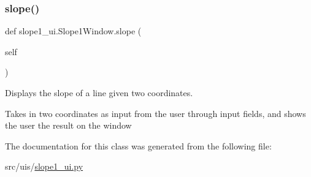 \subsubsection{\texorpdfstring{slope()}{slope()}}
{\footnotesize\ttfamily def slope1\+\_\+ui.\+Slope1\+Window.\+slope (\begin{DoxyParamCaption}\item[{}]{self }\end{DoxyParamCaption})}



Displays the slope of a line given two coordinates. 

Takes in two coordinates as input from the user through input fields, and shows the user the result on the window 

The documentation for this class was generated from the following file\+:\begin{DoxyCompactItemize}
\item 
src/uis/\hyperlink{slope1__ui_8py}{slope1\+\_\+ui.\+py}\end{DoxyCompactItemize}
